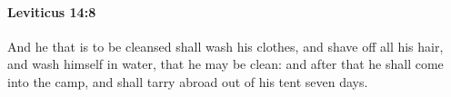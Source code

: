 
		\paragraph{Leviticus 14:8} %
			\label{LEVITICUS-14-8}

			And he that is to be cleansed shall wash his clothes, and shave off all his hair, and wash himself in water, that he may be clean: and after that he shall come into the camp, and shall tarry abroad out of his tent seven days.


